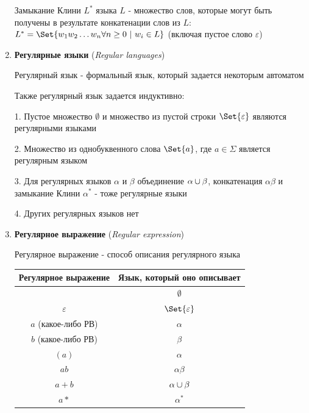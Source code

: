 \documentclass[12pt]{article}
\begin{document}
\begin{enumerate}
        Замыкание Клини $L^*$ языка $L$ - множество слов, которые могут быть получены в результате конкатенации слов из $L$: $L^* = \Set{w_1 w_2 \dots w_n \forall n \geq 0 \ | \ w_i \in L}$ (включая пустое слово $\varepsilon$)

        \item \textbf{Регулярные языки} (\textit{Regular languages})

        Регулярный язык - формальный язык, который задается некоторым автоматом

        Также регулярный язык задается индуктивно:

        1. Пустое множество $\emptyset$ и множество из пустой строки $\Set{\varepsilon}$ являются регулярными языками

        2. Множество из однобуквенного слова $\Set{a}$, где $a \in \Sigma$ является регулярным языком

        3. Для регулярных языков $\alpha$ и $\beta$ объединение $\alpha \cup \beta$, конкатенация $\alpha\beta$ и замыкание Клини $\alpha^*$ - тоже регулярные языки

        4. Других регулярных языков нет

        \item \textbf{Регулярное выражение} (\textit{Regular expression})

        Регулярное выражение - способ описания регулярного языка

        \begin{tabular}{c|c}
            Регулярное выражение & Язык, который оно описывает \\
            \hline
            & $\emptyset$                 \\
            $\varepsilon$        & $\Set{\varepsilon}$         \\
            $a$ (какое-либо РВ)  & $\alpha$                    \\
            $b$ (какое-либо РВ)  & $\beta$                     \\
            $(a)$                & $\alpha$                    \\
            $ab$                 & $\alpha\beta$               \\
            $a + b$              & $\alpha \cup \beta$       \\
            $a*$                 & $\alpha^*$                  \\

        \end{tabular}


\end{enumerate}
\end{document}
